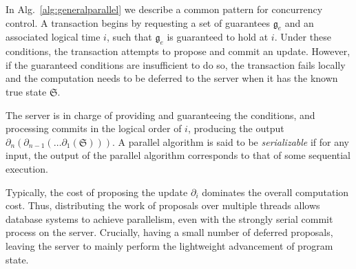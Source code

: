 \documentclass{article} %
\newcommand{\Comments}{1}
\newcommand{\note}[2]{\ifnum\Comments=1\textcolor{#1}{#2}\fi}
\newcommand{\xinghao}[1]{\note{red}{[XP: #1]}}
\newcommand{\algref}[1]{Alg.~\ref{#1}}
\begin{document}



In \algref{alg:generalparallel} we describe a common pattern for concurrency control.
A transaction begins by requesting a set of guarantees $\mathfrak{g}_e$ and an associated logical time $i$, such that $\mathfrak{g}_e$ is guaranteed to hold at $i$.
Under these conditions, the transaction attempts to propose and commit an update.
However, if the guaranteed conditions are insufficient to do so, the transaction fails locally and the computation needs to be deferred to the server when it has the known true state $\mathfrak{S}$.

The server is in charge of providing and guaranteeing the conditions, and processing commits in the logical order of $i$, producing the output $\partial_n (\partial_{n-1}(\ldots \partial_1(\mathfrak{S})))$.
A parallel algorithm is said to be \emph{serializable} 
if for any input, the output of the parallel algorithm corresponds to that of some sequential execution.

Typically, the cost of proposing the update $\partial_i$ dominates the overall computation cost.
Thus, distributing the work of proposals over multiple threads allows database systems to achieve parallelism, even with the strongly serial commit process on the server.
Crucially, having a small number of deferred proposals, leaving the server to mainly perform the lightweight advancement of program state.
\end{document}
